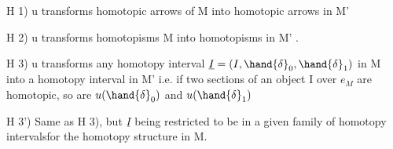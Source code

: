 H 1)  u transforms homotopic arrows of M into homotopic arrows in M'

H 2)  u transforms homotopisms  M into homotopisms in M' .

H 3)  u transforms any homotopy interval $\underline{I} = (I,\hand{\delta}_0,\hand{\delta}_1)$ in M into a
homotopy interval in M' \hand{(} i.e. if two sections of an object
I over $e_M$ are homotopic, so are $u(\hand{\delta}_0)$ and $u(\hand{\delta}_1)$

H 3')  Same as H 3), but $\underline{I}$ being restricted to be in a given %
 family of homotopy intervals\hand{,}for the homotopy 
structure in M.

